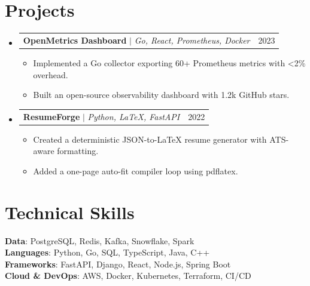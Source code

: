 \documentclass[letterpaper,11pt]{article}
\makeatletter
\newcommand{\resumeItem}[1]{
  \item\small{{#1 \vspace{-2pt}}}
}
\newcommand{\resumeProjectHeading}[2]{
    \item
    \begin{tabular*}{0.97\textwidth}{l@{\extracolsep{\fill}}r}
      \small#1 & #2 \\
    \end{tabular*}\vspace{-7pt}
}
\newcommand{\resumeSubHeadingListStart}{\begin{itemize}[leftmargin=0.15in, label={}]}
\newcommand{\resumeSubHeadingListEnd}{\end{itemize}}
\newcommand{\resumeItemListStart}{\begin{itemize}}
\newcommand{\resumeItemListEnd}{\end{itemize}\vspace{-5pt}}
\makeatother
\begin{document}
\section{Projects}
    \resumeSubHeadingListStart
    \resumeProjectHeading
        {\textbf{OpenMetrics Dashboard} $|$ \emph{Go, React, Prometheus, Docker}}{2023}
      \resumeItemListStart
        \resumeItem{Implemented a Go collector exporting 60+ Prometheus metrics with \textless{}2\% overhead.}
        \resumeItem{Built an open-source observability dashboard with 1.2k GitHub stars.}
      \resumeItemListEnd
    \resumeProjectHeading
        {\textbf{ResumeForge} $|$ \emph{Python, LaTeX, FastAPI}}{2022}
      \resumeItemListStart
        \resumeItem{Created a deterministic JSON-to-LaTeX resume generator with ATS-aware formatting.}
        \resumeItem{Added a one-page auto-fit compiler loop using pdflatex.}
      \resumeItemListEnd
    \resumeSubHeadingListEnd

\section{Technical Skills}
 \begin{itemize}[leftmargin=0.15in, label={}]
    \small{\item{
     \textbf{Data}{: PostgreSQL, Redis, Kafka, Snowflake, Spark} \\
     \textbf{Languages}{: Python, Go, SQL, TypeScript, Java, C++} \\
     \textbf{Frameworks}{: FastAPI, Django, React, Node.js, Spring Boot} \\
     \textbf{Cloud \& DevOps}{: AWS, Docker, Kubernetes, Terraform, CI/CD}
    }}
 \end{itemize}
\end{document}
